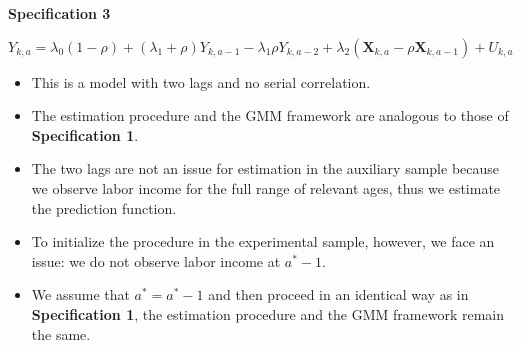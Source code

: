 \documentclass[static]{JJH-Beamer}
\begin{document}
\begin{frame}

\begin{center}
\textbf{Specification 3}
\end{center}

\end{frame}

\begin{frame}

\begin{equation}
Y_{k,a} = \lambda_{0} \left( 1 - \rho \right) + \left( \lambda_{1} + \rho \right) Y_{k,a-1} - \lambda_{1} \rho Y_{k,a-2} + \lambda_{2} \left( \bm{X}_{k,a} - \rho \bm{X}_{k,a-1}  \right) + U_{k,a} \label{eq:rhotransform}
\end{equation}

\end{frame}

\begin{frame}

\begin{itemize}
\item This is a model with two lags and no serial correlation.
\item The estimation procedure and the GMM framework are analogous to those of \textbf{Specification 1}.
\item The two lags are not an issue for estimation in the auxiliary sample because we observe labor income for the full range of relevant ages, thus we estimate the prediction function.
\item To initialize the procedure in the experimental sample, however, we face an issue: we do not observe labor income at $a^* - 1$.
\item We assume that $a^* = a^* - 1$ and then proceed in an identical way as in \textbf{Specification 1}, the estimation procedure and the GMM framework remain the same.
\end{itemize}

\end{frame}
\end{document}
